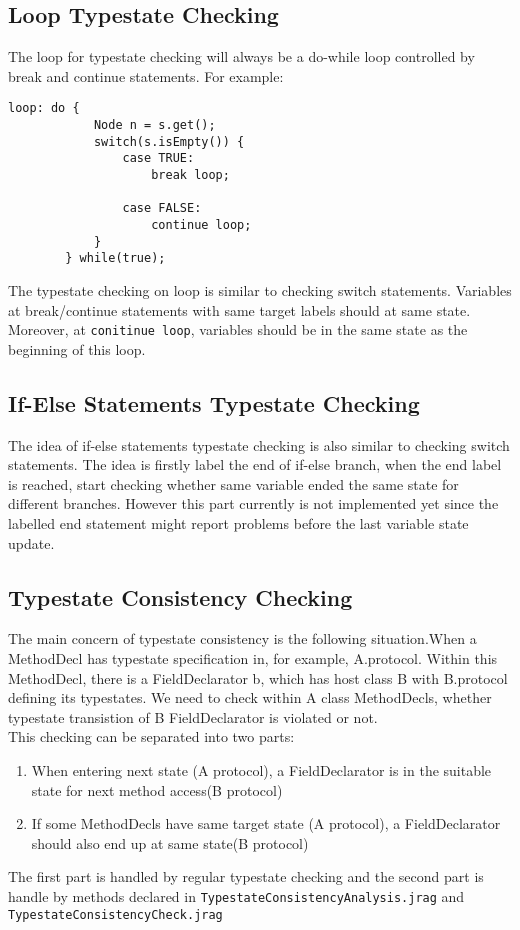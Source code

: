 \documentclass[]{article}
\begin{document}
\subsection{Loop Typestate Checking}
The loop for typestate checking will always be a do-while loop controlled by break and continue statements. For example:
\begin{lstlisting}
loop: do {
			Node n = s.get();
			switch(s.isEmpty()) {
				case TRUE:
					break loop;

				case FALSE:
					continue loop;
			}
		} while(true);
\end{lstlisting}
The typestate checking on loop is similar to checking switch statements. Variables at break/continue statements with same target labels should at same state. Moreover, at \texttt{conitinue loop}, variables should be in the same state as the beginning of this loop.

\subsection{If-Else Statements Typestate Checking}
The idea of if-else statements typestate checking is also similar to checking switch statements. The idea is firstly label the end of if-else branch, when the end label is reached, start checking whether same variable ended the same state for different branches. However this part currently is not implemented yet since the labelled end statement might report problems before the last variable state update.


\subsection{Typestate Consistency Checking}
The main concern of typestate consistency is the following situation.When a MethodDecl has typestate specification in, for example, A.protocol. Within this MethodDecl, there is a FieldDeclarator b, which has host class B with B.protocol defining its typestates. We need to check within A class MethodDecls, whether typestate transistion of B FieldDeclarator is violated or not.\\[0.2cm]
This checking can be separated into two parts:
\begin{enumerate}
	\item When entering next state (A protocol), a FieldDeclarator is in the suitable state for next method access(B protocol)
	\item If some MethodDecls have same target state (A protocol), a FieldDeclarator should also end up at same state(B protocol)
\end{enumerate}
The first part is handled by regular typestate checking and the second part is handle by methods declared in \texttt{TypestateConsistencyAnalysis.jrag} and \texttt{TypestateConsistencyCheck.jrag}
\end{document}
